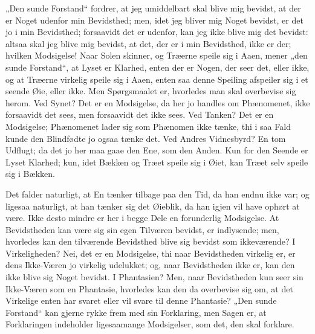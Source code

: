 \documentclass[12pt]{book}
\newcommand{\opage}[1]{\marginnote{\footnotesize\textit{[#1]}}}
\begin{document}
„Den sunde Forstand“ fordrer, at jeg umiddelbart skal blive mig bevidst, at der er
Noget udenfor min Bevidsthed; men, idet jeg bliver mig Noget bevidst, er det jo i min
Bevidsthed; forsaavidt det er udenfor, kan jeg ikke blive mig det bevidst: altsaa skal
jeg blive mig bevidst, at det, der er i min Bevidsthed, ikke er der; hvilken
Modsigelse! Naar Solen skinner, og Træerne speile sig i Aaen, mener „den sunde
Forstand“, at Lyset er Klarhed, enten der er Nogen, der seer det, eller ikke, og at
Træerne virkelig speile sig i Aaen, enten saa denne Speiling afspeiler sig i et seende
Øie, eller ikke. Men Spørgsmaalet er, hvorledes man skal overbevise sig herom. Ved
Synet? Det er en Modsigelse, da her jo handles om Phænomenet, ikke forsaavidt det
sees, men forsaavidt det ikke sees. Ved Tanken? Det er en Modsigelse; Phænomenet
lader sig som Phænomen ikke tænke, thi i saa Fald kunde den Blindfødte jo ogsaa tænke
det. Ved Andres Vidnesbyrd? En tom Udflugt; da det jo her maa gaae den Ene, som den
Anden. Kun for den Seende er Lyset Klarhed; kun, idet Bækken og Træet speile sig i
Øiet, kan Træet selv speile sig i Bækken.

Det falder naturligt, at En tænker tilbage paa den Tid, da han endnu ikke var; og
ligesaa naturligt, at han tænker sig det Øieblik, da han igjen vil have ophørt at være.
\opage{42} Ikke desto mindre er her i begge Dele en forunderlig Modsigelse. At Bevidstheden kan
være sig sin egen Tilværen bevidst, er indlysende; men, hvorledes kan den tilværende
Bevidsthed blive sig bevidst som ikkeværende? I Virkeligheden? Nei, det er en
Modsigelse, thi naar Bevidstheden virkelig er, er dens Ikke-Væren jo virkelig
udelukket; og, naar Bevidstheden ikke er, kan den ikke blive sig Noget bevidst. I
Phantasien? Men, naar Bevidstheden kun seer sin Ikke-Væren som en Phantasie,
hvorledes kan den da overbevise sig om, at det Virkelige enten har svaret eller vil
svare til denne Phantasie? „Den sunde Forstand“ kan gjerne rykke frem med sin
Forklaring, men Sagen er, at Forklaringen indeholder ligesaamange Modsigelser, som
det, den skal forklare.
\end{document}
